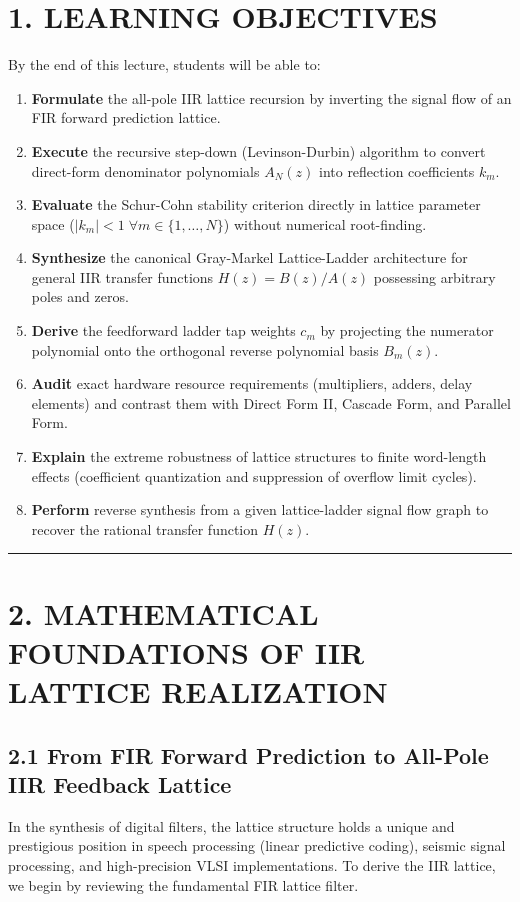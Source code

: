 \documentclass[11pt,a4paper]{article}
\begin{document}
\section{1. LEARNING OBJECTIVES}
By the end of this lecture, students will be able to:
\begin{enumerate}
    \item \textbf{Formulate} the all-pole IIR lattice recursion by inverting the signal flow of an FIR forward prediction lattice.
    \item \textbf{Execute} the recursive step-down (Levinson-Durbin) algorithm to convert direct-form denominator polynomials $A_N(z)$ into reflection coefficients $k_m$.
    \item \textbf{Evaluate} the Schur-Cohn stability criterion directly in lattice parameter space ($|k_m| < 1 \;\forall m \in \{1, \dots, N\}$) without numerical root-finding.
    \item \textbf{Synthesize} the canonical Gray-Markel Lattice-Ladder architecture for general IIR transfer functions $H(z) = B(z)/A(z)$ possessing arbitrary poles and zeros.
    \item \textbf{Derive} the feedforward ladder tap weights $c_m$ by projecting the numerator polynomial onto the orthogonal reverse polynomial basis $B_m(z)$.
    \item \textbf{Audit} exact hardware resource requirements (multipliers, adders, delay elements) and contrast them with Direct Form II, Cascade Form, and Parallel Form.
    \item \textbf{Explain} the extreme robustness of lattice structures to finite word-length effects (coefficient quantization and suppression of overflow limit cycles).
    \item \textbf{Perform} reverse synthesis from a given lattice-ladder signal flow graph to recover the rational transfer function $H(z)$.
\end{enumerate}

\noindent\rule{\textwidth}{0.5pt}

\section{2. MATHEMATICAL FOUNDATIONS OF IIR LATTICE REALIZATION}

\subsection{2.1 From FIR Forward Prediction to All-Pole IIR Feedback Lattice}
In the synthesis of digital filters, the lattice structure holds a unique and prestigious position in speech processing (linear predictive coding), seismic signal processing, and high-precision VLSI implementations. To derive the IIR lattice, we begin by reviewing the fundamental FIR lattice filter.
\end{document}
